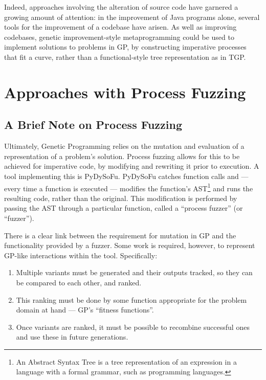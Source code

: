 \documentclass[12pt]{llncs} %
\begin{document}
Indeed, approaches involving the alteration of source code have garnered a
growing amount of attention: in the improvement of Java programs alone, several
tools for the improvement of a codebase have
arisen\cite{cody2015locogp,arcuri2008multi,castle2012evolving}. As well as
improving codebases, genetic improvement-style metaprogramming could be used to
implement solutions to problems in GP, by constructing imperative processes that
fit a curve, rather than a functional-style tree representation as in
TGP\cite{koza1994genetic}.\par



\section{Approaches with Process Fuzzing}

\subsection{A Brief Note on Process Fuzzing}
Ultimately, Genetic Programming relies on the mutation and evaluation of a
representation of a problem's solution. Process fuzzing allows for this to be
achieved for imperative code, by modifying and rewriting it prior to execution.
A tool implementing this is PyDySoFu\cite{pydysofu}. PyDySoFu catches function
calls and --- every time a function is executed --- modifies the function's
AST\footnote{An Abstract Syntax Tree is a tree representation of an expression
  in a language with a formal grammar, such as programming languages.}
and runs the resulting code, rather than the original. This modification is
performed by passing the AST through a particular function, called a ``process
fuzzer'' (or ``fuzzer'').\par

There is a clear link between the requirement for mutation in GP and the
functionality provided by a fuzzer. Some work is required, however, to represent
GP-like interactions within the tool. Specifically:

\begin{enumerate}
\item Multiple variants must be generated and their outputs tracked, so they can
be compared to each other, and ranked.
\item This ranking must be done by some function appropriate for the problem
domain at hand --- GP's ``fitness functions''.
\item Once variants are ranked, it must be possible to recombine successful ones
and use these in future generations.
\end{enumerate}
\end{document}
